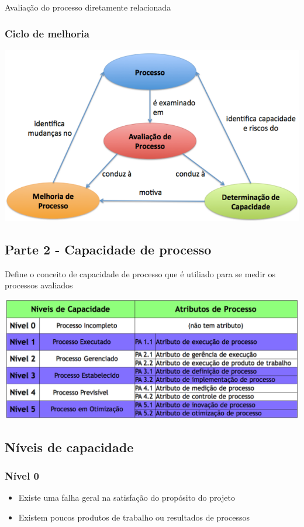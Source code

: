\documentclass{article}
\begin{document}
	Avaliação do processo diretamente relacionada
	
	\subsubsection{Ciclo de melhoria}
	\begin{center}
		\includegraphics[scale=0.30]{ciclo_melhoria}	
	\end{center}			
		
\subsection{Parte 2 - Capacidade de processo}
	Define o conceito de capacidade de processo que é utiliado para se medir os processos avaliados

	\begin{center}
		\includegraphics[scale=0.30]{capacidade_processo}
	\end{center}
	
\subsection{Níveis de capacidade}
	\subsubsection{Nível 0}
		\begin{itemize}
		\item Existe uma falha geral na satisfação do propósito do projeto
		\item Existem poucos produtos de trabalho ou resultados de processos
		
		\end{itemize}				
		
\end{document}
